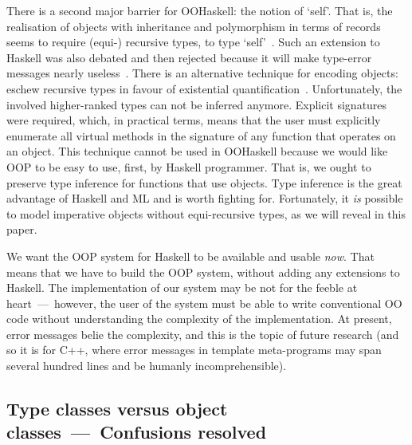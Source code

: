 There is a second major barrier for OOHaskell: the notion of
`self'. That is, the realisation of objects with inheritance and
polymorphism in terms of records seems to require (equi-) recursive
types, to type `self'~\cite{PT94}.
%
%
Such an extension to Haskell was also debated and then rejected
because it will make type-error messages nearly
useless~\cite{Hughes02}. There is an alternative technique for
encoding objects: eschew recursive types in favour of existential
quantification~\cite{PT94}. Unfortunately, the involved higher-ranked
types can not be inferred anymore. Explicit signatures were required,
which, in practical terms, means that the user must explicitly
enumerate all virtual methods in the signature of any function that
operates on an object. This technique cannot be used in OOHaskell
because we would like OOP to be easy to use, first, by Haskell
programmer. That is, we ought to preserve type inference for functions
that use objects. Type inference is the great advantage of Haskell and
ML and is worth fighting for. Fortunately, it \emph{is} possible to
model imperative objects without equi-recursive types, as we will reveal in
this paper.

We want the OOP system for Haskell to be available and usable
\emph{now}. That means that we have to build the OOP system, without
adding any extensions to Haskell. The implementation of our system may
be not for the feeble at heart~---~however, the user of the system
must be able to write conventional OO code without understanding the
complexity of the implementation. At present, error messages belie the
complexity, and this is the topic of future research (and so it is for
C++, where error messages in template meta-programs may span several
hundred lines and be humanly incomprehensible).



\subsection*{Type classes versus object classes~---~Confusions resolved}

